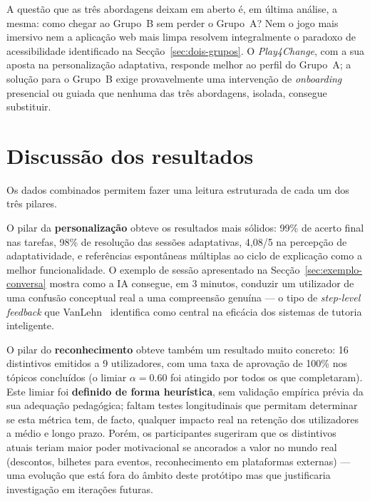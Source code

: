A questão que as três abordagens deixam em aberto é, em última análise, a mesma: como chegar ao Grupo~B sem perder o Grupo~A? Nem o jogo mais imersivo nem a aplicação web mais limpa resolvem integralmente o paradoxo de acessibilidade identificado na Secção~\ref{sec:dois-grupos}. O \emph{Play4Change}, com a sua aposta na personalização adaptativa, responde melhor ao perfil do Grupo~A; a solução para o Grupo~B exige provavelmente uma intervenção de \emph{onboarding} presencial ou guiada que nenhuma das três abordagens, isolada, consegue substituir.

\section{Discussão dos resultados}
\label{sec:discussao-resultados}

Os dados combinados permitem fazer uma leitura estruturada de cada um dos três pilares.

O pilar da \textbf{personalização} obteve os resultados mais sólidos: 99\% de acerto final nas tarefas, 98\% de resolução das sessões adaptativas, 4,08/5 na percepção de adaptatividade, e referências espontâneas múltiplas ao ciclo de explicação como a melhor funcionalidade. O exemplo de sessão apresentado na Secção~\ref{sec:exemplo-conversa} mostra como a IA consegue, em 3 minutos, conduzir um utilizador de uma confusão conceptual real a uma compreensão genuína --- o tipo de \emph{step-level feedback} que VanLehn~\cite{vanlehn2011relative} identifica como central na eficácia dos sistemas de tutoria inteligente.

O pilar do \textbf{reconhecimento} obteve também um resultado muito concreto: 16 distintivos emitidos a 9 utilizadores, com uma taxa de aprovação de 100\% nos tópicos concluídos (o limiar $\alpha = 0.60$ foi atingido por todos os que completaram). Este limiar foi \textbf{definido de forma heurística}, sem validação empírica prévia da sua adequação pedagógica; faltam testes longitudinais que permitam determinar se esta métrica tem, de facto, qualquer impacto real na retenção dos utilizadores a médio e longo prazo. Porém, os participantes sugeriram que os distintivos atuais teriam maior poder motivacional se ancorados a valor no mundo real (descontos, bilhetes para eventos, reconhecimento em plataformas externas) --- uma evolução que está fora do âmbito deste protótipo mas que justificaria investigação em iterações futuras.

